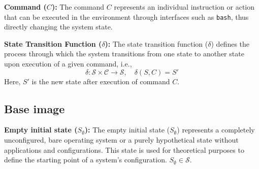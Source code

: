 \vspace{-0.5em}

\textbf{Command ($C$):} The command $C$ represents an individual instruction or action that can be executed in the environment through interfaces such as \texttt{bash}, thus directly changing the system state.
\vspace{-0.5em}

\textbf{State Transition Function ($\delta$):}
The state transition function ($\delta$) defines the process through which the system transitions from one state to another state upon execution of a given command, i.e., 
\begin{equation}
    \delta: \mathcal{S} \times \mathcal{C} \rightarrow \mathcal{S},\quad \delta(S, C) = S'
\end{equation}
Here, $S'$ is the new state after execution of command $C$.
\vspace{-0.5em}

\subsection{Base image}
\vspace{-0.5em}

\textbf{Empty initial state ($S_\emptyset$):}
The empty initial state ($S_{\emptyset}$) represents a completely unconfigured, bare operating system or a purely hypothetical state without applications and configurations.
This state is used for theoretical purposes to define the starting point of a system's configuration.
$S_\emptyset \in \mathcal{S}$.
\vspace{-0.5em}

